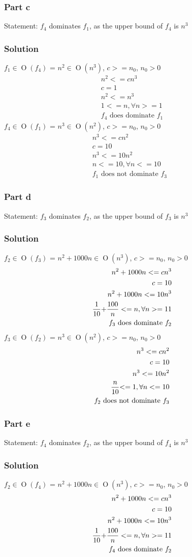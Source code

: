 \documentclass[10pt,letterpaper,oneside]{article}
\newcommand{\Part}[1]{\subsubsection*{Part #1}}
\newcommand{\Solution}{\subsubsection*{Solution}}
\DeclareMathOperator{\Omicron}{O}
\newcommand{\BigOh}[1]{\Omicron(#1)}
\begin{document}
	\Part{c}
	Statement: $f_4$ dominates $f_1$, as the upper bound of $f_4$ is $n^3$ 
	\Solution
		$f_1 \in \BigOh{f_4}$ = $n^2 \in \BigOh{n^3}$,	
		$c >= n_0$,
		$ n_0 > 0$
		\begin{eqnarray*}
			\text{$n^2 <= cn^3$}\\
			\text{$c=1$}\\
			\text{$n^2 <= n^3$}\\
			\text{$1 <= n$}, \forall n >= 1\\
			\text{$f_4$ does dominate $f_1$}
		\end{eqnarray*}
		$f_4 \in \BigOh{f_1}$ = $n^3 \in \BigOh{n^2}$,	
		$c >= n_0$,
		$ n_0 > 0$
		\begin{eqnarray*}
			\text{$n^3 <= cn^2$}\\
			\text{$c=10$}\\
			\text{$n^3 <= 10n^2$}\\
			\text{$n <= 10$}, \forall n <= 10\\
			\text{$f_1$ does not dominate $f_3$ }
		\end{eqnarray*}
	\Part{d}
	Statement: $f_3$ dominates $f_2$, as the upper bound of $f_3$ is $n^3$
	\Solution
		$f_2 \in \BigOh{f_3}$ = $n^2 + 1000n \in \BigOh{n^3}$,	
		$c >= n_0$,
		$ n_0 > 0$
		\begin{eqnarray*}
			\text{$n^2 + 1000n<= cn^3$}\\
			\text{$c=10$}\\
			\text{$n^2 + 1000n <= 10n^3$}\\
			\frac{1}{10}\text{$ + \frac{100}{n} <= n$}, \forall n >= 11\\
			\text{$f_3$ does dominate $f_2$}
		\end{eqnarray*}
		$f_3 \in \BigOh{f_2}$ = $n^3\in \BigOh{n^2}$,	
		$c >= n_0$,
		$ n_0 > 0$
		\begin{eqnarray*}
			\text{$n^3<= cn^2$}\\
			\text{$c=10$}\\
			\text{$n^3 <= 10n^2$}\\
			\frac{n}{10}\text{$ <= 1$}, \forall n <= 10\\
			\text{$f_2$ does not dominate $f_3$}
		\end{eqnarray*}
	\Part{e}
	Statement: $f_4$ dominates $f_2$, as the upper bound of $f_4$ is $n^3$
	\Solution
		$f_2 \in \BigOh{f_4}$ = $n^2 + 1000n \in \BigOh{n^3}$,	
		$c >= n_0$,
		$ n_0 > 0$
		\begin{eqnarray*}
			\text{$n^2 + 1000n<= cn^3$}\\
			\text{$c=10$}\\
			\text{$n^2 + 1000n <= 10n^3$}\\
			\frac{1}{10}\text{$ + \frac{100}{n} <= n$}, \forall n >= 11\\
			\text{$f_4$ does dominate $f_2$}
		\end{eqnarray*}
\end{document}
